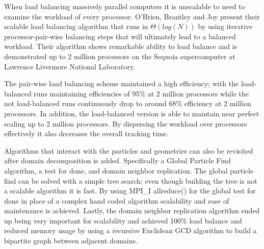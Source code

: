 %
When load balancing massively parallel computers it is unscalable to need to examine the workload of every processor.
%
O'Brien, Brantley and Joy present their scalable load balancing algorithm that runs in $\Theta ( log ( N ) )$ by using iterative processor-pair-wise balancing steps that will ultimately lead to a balanced workload.
%
Their algorithm shows remarkable ability to load balance and is demonstrated up to 2 million processors on the Sequoia supercomputer at Lawrence Livermore National Laboratory.
~\cite{o2013scalable}
%

%
The pair-wise load balancing scheme maintained a high efficiency; with the load-balanced runs maintaining efficiencies of 95\% at 2 million processors while the not load-balanced runs continuously drop to around 68\% efficiency at 2 million processors.
%
In addition, the load-balanced version is able to maintain near perfect scaling up to 2 million processors.
%
By dispersing the workload over processors effectively it also decreases the overall tracking time.
~\cite{o2013scalable}
%

Algorithms that interact with the particles and geometries can also be revisited after domain decomposition is added.
%
Specifically a Global Particle Find algorithm, a test for done, and domain neighbor replication.
%
The global particle find can be solved with a simple tree search; even though building the tree is not a scalable algorithm it is fast.
%
By using MPI\_I allreduce() for the global test for done in place of a complex hand coded algorithm scalability and ease of maintenance is achieved.
%
Lastly, the domain neighbor replication algorithm ended up being very important for scalability and achieved 100\% load balance and reduced memory usage by using a recursive Euclidean GCD algorithm to build a bipartite graph between adjacent domains. ~\cite{o2015particle}
%


